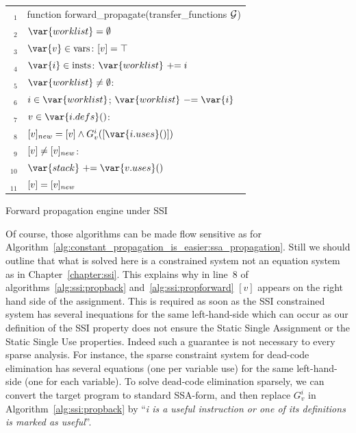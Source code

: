 \begin{algorithm}[t!]
\begin{tabular}{rl}
$_1$ & \textsf{function forward\_propagate}(transfer\_functions $\cal G$)\\
$_2$ & \1$\var{worklist} = \emptyset$\\
$_3$ & \1\Foreach $\var{v} \in \textrm{vars}$: $[v]=\top$\\
$_4$ & \1\Foreach $\var{i} \in \textrm{insts}$: $\var{worklist}\ +\hspace{-0.3em}= i$\\
$_5$ & \1\While $\var{worklist}\neq \emptyset$:\\
$_6$ & \1\1 \Let $i \in \var{worklist}$; $\var{worklist}\ -\hspace{-0.3em}= \var{i}$\\
$_7$ & \1\1 \Foreach $v \in \var{i.defs}()$:\\
$_8$ & \1  \2  $\val{v}_{new} = \val{v} \wedge G_v^i(\val{\var{i.uses}()})$\\
$_9$ &  \1 \2  \If $[v] \neq [v]_{new}$: \\
$_{10}$& \1   \3 $\var{stack}\ +\hspace{-0.3em}=\var{v.uses}()$\\
$_{11}$& \1   \3 $[v] = [v]_{new}$\\
\end{tabular}
\caption{\label{alg:ssi:propforward} Forward propagation engine under SSI}
\end{algorithm}

Of course, those algorithms can be made flow sensitive as for Algorithm~\ref{alg:constant_propagation_is_easier:ssa_propagation}. Still we should outline that what is solved here is a constrained system not an equation system as in Chapter~\ref{chapter:ssi}. This explains why in line~8 of algorithms~\ref{alg:ssi:propback} and~\ref{alg:ssi:propforward} $[v]$ appears on the right hand side of the assignment.
This is required as soon as the SSI constrained system has several inequations for the same left-hand-side which can occur as our definition of the SSI property does not ensure the Static Single Assignment or the Static Single Use properties.
Indeed such a guarantee is not necessary to every sparse analysis.
For instance, the sparse constraint system for dead-code elimination has several equations (one per variable use) for the same left-hand-side (one for each variable).
To solve dead-code elimination sparsely, we can convert the target program to standard SSA-form, and then replace $G_v^i$ in Algorithm~\ref{alg:ssi:propback} by ``\emph{i is a useful instruction or one of its definitions is marked as useful}''. 

